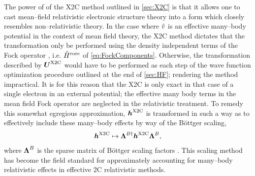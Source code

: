 The power of of the X2C method outlined in \cref{sec:X2C} is that it allows one
to cast mean--field relativistic electronic structure theory into a form which closely 
resembles non--relativistic theory. 
In the case where $\hat{v}$ is an effective many--body potential in the context of mean field theory, the X2C method
dictates that the transformation only be performed using the density independent terms of the Fock operator \cite{Reiher13_184105},
i.e. $\hat{H}^\mathrm{core}$ of \cref{eq:FockComponents}. Otherwise, the transformation described by $\boldsymbol{U}^{\mathrm{X2C}}$ would
have to be performed as each step of the wave function optimization procedure outlined at the end  of \cref{sec:HF};
rendering the method impractical. It is for this reason that the X2C is only exact in that case of a single electron
in an external potential; the effective many body terms in the mean field Fock operator are neglected in the 
relativistic treatment. To remedy this somewhat egregious approximation, $\boldsymbol{h}^{\mathrm{X2C}}$ is transformed in such a
way as to effectively include these many--body effects by way of the B\"{o}ttger scaling,
\begin{equation}
  \label{eq:BScaling}
\boldsymbol{h}^{\mathrm{X2C}} \mapsto \boldsymbol{\Lambda}^{B\dagger} \boldsymbol{h}^{\mathrm{X2C}} \boldsymbol{\Lambda}^{B},
\end{equation}
where $\boldsymbol{\Lambda}^B$ is the sparse matrix of B\"{o}ttger scaling factors \cite{Boettger00_7809}. 
This scaling method
has become the field standard for approximately accounting for many--body relativistic effects in effective
2C relativistic methods.

